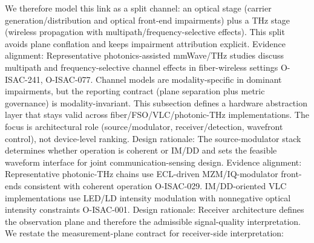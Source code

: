 {}We therefore model this link as a split channel: an optical stage (carrier generation/distribution and optical front-end impairments) plus a THz stage (wireless propagation with multipath/frequency-selective effects). This split avoids plane conflation and keeps impairment attribution explicit.\markdownRendererParagraphSeparator
{}Evidence alignment: Representative photonics-assisted mmWave/THz studies discuss multipath and frequency-selective channel effects in fiber-wireless settings O-ISAC-241, O-ISAC-077.\markdownRendererParagraphSeparator
{} Channel models are modality-specific in dominant impairments, but the reporting contract (plane separation plus metric governance) is modality-invariant.\markdownRendererInterblockSeparator
{}\markdownRendererThematicBreak{}\markdownRendererInterblockSeparator
{}
\markdownRendererSectionEnd 
\markdownRendererSectionEnd \markdownRendererSectionBegin
{}\markdownRendererInterblockSeparator
{}This subsection defines a hardware abstraction layer that stays valid across fiber/FSO/VLC/photonic-THz implementations. The focus is architectural role (source/modulator, receiver/detection, wavefront control), not device-level ranking.\markdownRendererInterblockSeparator
{}\markdownRendererSectionBegin
{}\markdownRendererInterblockSeparator
{}Design rationale: The source-modulator stack determines whether operation is coherent or IM/DD and sets the feasible waveform interface for joint communication-sensing design.\markdownRendererParagraphSeparator
{}Evidence alignment: Representative photonic-THz chains use ECL-driven MZM/IQ-modulator front-ends consistent with coherent operation O-ISAC-029. IM/DD-oriented VLC implementations use LED/LD intensity modulation with nonnegative optical intensity constraints O-ISAC-001.\markdownRendererInterblockSeparator
{}
\markdownRendererSectionEnd \markdownRendererSectionBegin
{}\markdownRendererInterblockSeparator
{}Design rationale: Receiver architecture defines the observation plane and therefore the admissible signal-quality interpretation.\markdownRendererParagraphSeparator
{}We restate the measurement-plane contract for receiver-side interpretation:\markdownRendererSoftLineBreak
{}\markdownRendererSoftLineBreak
